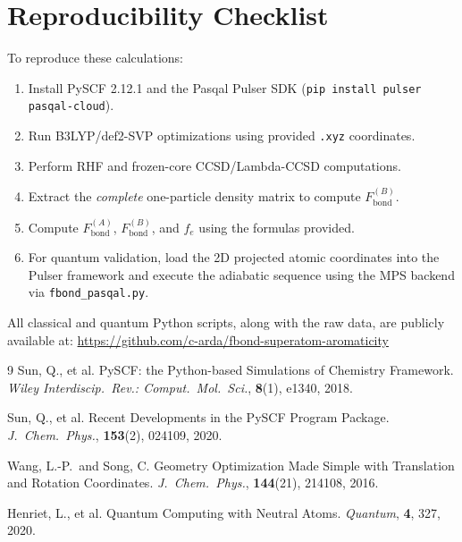 \documentclass[12pt,a4paper]{article}
\begin{document}
\section{Reproducibility Checklist}

To reproduce these calculations:

\begin{enumerate}
  \item Install PySCF 2.12.1 and the Pasqal Pulser SDK
    (\texttt{pip install pulser pasqal-cloud}).
  \item Run B3LYP/def2-SVP optimizations using provided
    \texttt{.xyz} coordinates.
  \item Perform RHF and frozen-core CCSD/Lambda-CCSD computations.
  \item Extract the \emph{complete} one-particle density matrix to
    compute $F_{\text{bond}}^{(B)}$.
  \item Compute $F_{\text{bond}}^{(A)}$, $F_{\text{bond}}^{(B)}$,
    and $f_e$ using the formulas provided.
  \item For quantum validation, load the 2D projected atomic coordinates
    into the Pulser framework and execute the adiabatic sequence using
    the MPS backend via \texttt{fbond\_pasqal.py}.
\end{enumerate}

All classical and quantum Python scripts, along with the raw data, are
publicly available at:
\url{https://github.com/c-arda/fbond-superatom-aromaticity}

\begin{thebibliography}{9}
  Sun, Q., et al.
  PySCF: the Python-based Simulations of Chemistry Framework.
  \emph{Wiley Interdiscip.\ Rev.: Comput.\ Mol.\ Sci.},
  \textbf{8}(1), e1340, 2018.

  Sun, Q., et al.
  Recent Developments in the PySCF Program Package.
  \emph{J.\ Chem.\ Phys.}, \textbf{153}(2), 024109, 2020.

  Wang, L.-P.\ and Song, C.
  Geometry Optimization Made Simple with Translation and Rotation
  Coordinates.
  \emph{J.\ Chem.\ Phys.}, \textbf{144}(21), 214108, 2016.

  Henriet, L., et al.
  Quantum Computing with Neutral Atoms.
  \emph{Quantum}, \textbf{4}, 327, 2020.
\end{thebibliography}
\end{document}
